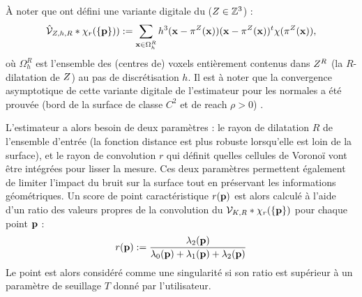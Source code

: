 À noter que  ont défini une variante digitale du
\VCM ($Z \in \mathbb{Z}^3$) :
%
\begin{equation}
  \hat{\mathcal{V}}_{Z,h,R} \ast \chi_r(\{\mathbf{p}\})) := \sum_{\mathbf{x} \in \Omega_h^R} h^3 (\mathbf{x} - \pi^{Z}(\mathbf{x})) (\mathbf{x} - \pi^{Z}(\mathbf{x}))^t \chi(\pi^{Z}(\mathbf{x})) ,
\end{equation}
%
où $\Omega_h^R$ est l'ensemble des (centres de) voxels entièrement contenus dans
$Z^R$ (la $R$-dilatation de $Z$) au pas de discrétisation $h$.
%
Il est à noter que la convergence asymptotique de cette variante digitale de
l'estimateur \VCM pour les normales a été prouvée (bord de la surface de classe
$C^2$ et de reach $\rho > 0$) \cite{Cuel2014DGCI}.


L'estimateur \VCM a alors besoin de deux paramètres : le rayon de dilatation $R$
de l'ensemble d'entrée (la fonction distance est plus robuste lorsqu'elle est
loin de la surface), et le rayon de convolution $r$ qui définit quelles cellules
de Voronoï vont être intégrées pour lisser la mesure. Ces deux paramètres
permettent également de limiter l'impact du bruit sur la surface tout en
préservant les informations géométriques. Un score de point caractéristique
$r(\mathbf{p})$ est alors calculé à l'aide d'un ratio des valeurs propres de la
convolution du \VCM $\mathcal{V}_{K,R} \ast \chi_r(\{\mathbf{p}\})$ pour chaque point
$\mathbf{p}$ :
%
\begin{equation}
  r(\mathbf{p}) := \frac{\lambda_2(\mathbf{p})}{\lambda_0(\mathbf{p}) + \lambda_1(\mathbf{p}) + \lambda_2(\mathbf{p})}
  \label{eq:VCM-ratio-eigenvalues}
\end{equation}
%
Le point est alors considéré comme une singularité si son ratio est supérieur à
un paramètre de seuillage $T$ donné par l'utilisateur.


